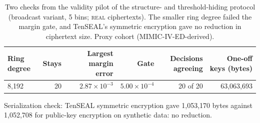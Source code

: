 \begin{table}[t]
\centering
\caption{Two checks from the validity pilot of the structure- and threshold-hiding protocol (broadcast variant, 5 bins; \textsc{real} ciphertexts). The smaller ring degree failed the margin gate, and TenSEAL's symmetric encryption gave no reduction in ciphertext size. Proxy cohort (MIMIC-IV-ED-derived).}
\label{tab:s10_pilot_checks}
\begin{tabular}{lrrrrr}
\toprule
Ring degree & Stays & Largest margin error & Gate & Decisions agreeing & One-off keys (bytes) \\
\midrule
8,192 & 20 & $2.87 \times 10^{-3}$ & $5.00 \times 10^{-4}$ & 20 of 20 & 63,063,693 \\
\bottomrule
\end{tabular}
\par\smallskip
\parbox{\linewidth}{\footnotesize Serialization check: TenSEAL symmetric encryption gave 1,053,170 bytes against 1,052,708 for public-key encryption on synthetic data: no reduction.}
\end{table}

